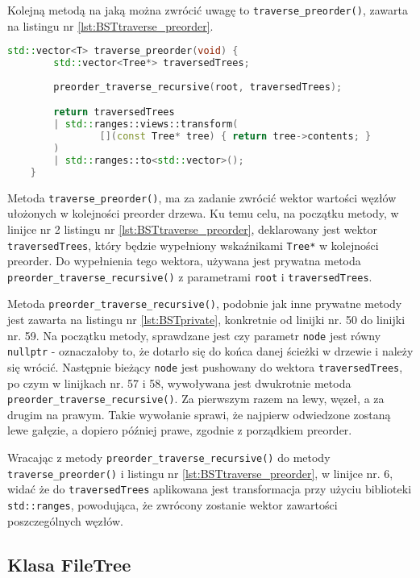 Kolejną metodą na jaką można zwrócić uwagę to \texttt{traverse\_preorder()}, zawarta na listingu nr \ref{lst:BSTtraverse_preorder}. 

\begin{lstlisting}[caption=Metoda \texttt{add()}, label={lst:BSTtraverse_preorder}, language=C++]
	std::vector<T> traverse_preorder(void) {
		std::vector<Tree*> traversedTrees;
	
		preorder_traverse_recursive(root, traversedTrees);

		return traversedTrees 
		| std::ranges::views::transform(
				[](const Tree* tree) { return tree->contents; }
		) 
		| std::ranges::to<std::vector>(); 
	}

\end{lstlisting}

Metoda \texttt{traverse\_preorder()}, ma za zadanie zwrócić wektor wartości węzłów ułożonych w kolejności preorder drzewa. Ku temu celu, na początku metody, w linijce nr 2 listingu nr \ref{lst:BSTtraverse_preorder}, deklarowany jest wektor \texttt{traversedTrees}, który będzie wypełniony wskaźnikami \texttt{Tree*} w kolejności preorder. Do wypełnienia tego wektora, używana jest prywatna metoda \texttt{preorder\_traverse\_recursive()} z parametrami \texttt{root} i \texttt{traversedTrees}.

Metoda \texttt{preorder\_traverse\_recursive()}, podobnie jak inne prywatne metody jest zawarta na listingu nr \ref{lst:BSTprivate}, konkretnie od linijki nr. 50 do linijki nr. 59. Na początku metody, sprawdzane jest czy parametr \texttt{node} jest równy \texttt{nullptr} - oznaczałoby to, że dotarło się do końca danej ścieżki w drzewie i należy się wrócić. Następnie bieżący \texttt{node} jest pushowany do wektora \texttt{traversedTrees}, po czym w linijkach nr. 57 i 58, wywoływana jest dwukrotnie metoda \texttt{preorder\_traverse\_recursive()}. Za pierwszym razem na lewy, węzeł, a za drugim na prawym. Takie wywołanie sprawi, że najpierw odwiedzone zostaną lewe gałęzie, a dopiero później prawe, zgodnie z porządkiem preorder.

Wracając z metody \texttt{preorder\_traverse\_recursive()} do metody \texttt{traverse\_preorder()} i listingu nr \ref{lst:BSTtraverse_preorder}, w linijce nr. 6, widać że do \texttt{traversedTrees} aplikowana jest transformacja przy użyciu biblioteki \texttt{std::ranges}, powodująca, że zwrócony zostanie wektor zawartości poszczególnych węzłów.

\subsection{Klasa FileTree} 

